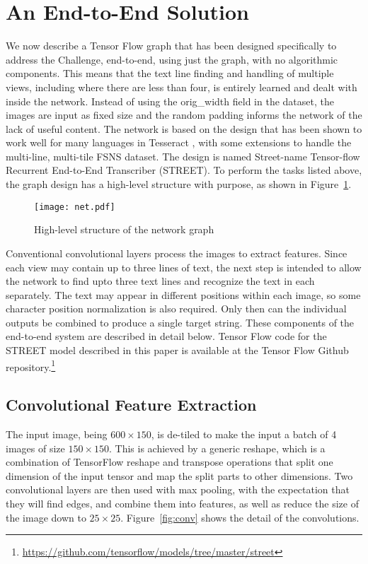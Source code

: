 \documentclass[runningheads]{llncs}
\begin{document}
\section{An End-to-End Solution} \label{baseline}

We now describe a Tensor Flow graph that has been designed specifically to address the Challenge,
 end-to-end, using just the graph, with no algorithmic components. This means that the text line
finding and handling of multiple views, including where there are less than four, is entirely learned
and dealt with inside the network. Instead of using the orig\_width field in the dataset, the images
are input as fixed size and the random padding informs the network of the lack of useful content.
 The network is based on the design that has been shown to work well for many languages in
 Tesseract \cite{tutorial},
 with some extensions to handle the multi-line, multi-tile FSNS dataset.
 The design is named Street-name Tensor-flow Recurrent End-to-End Transcriber (STREET).
 To perform the tasks listed above, the graph design has a high-level structure with purpose,
 as shown in Figure~\ref{fig:net}.

\begin{figure}
\centering
\vspace{-8cm}
\texttt{[image: net.pdf]}
\caption{High-level structure of the network graph}
\label{fig:net}
\end{figure}

Conventional convolutional layers process the images to extract features. Since each view may contain
 up to three lines of text, the next step is intended to allow the network to find upto three text lines
and recognize the text in each separately.
 The text may appear in different positions within each image, so some character
 position normalization is also required. Only then can the individual outputs be combined to produce
 a single target string. These components of the end-to-end system are described in detail below. 
Tensor Flow code for the STREET model described in this paper is available at the Tensor Flow Github
repository.\footnote{\url{https://github.com/tensorflow/models/tree/master/street}} 

\subsection{Convolutional Feature Extraction}

The input image, being $600\times150$, is de-tiled to make the input a batch of 4 images of size $150\times150$.
 This is achieved by a generic reshape, which is a combination of TensorFlow reshape and transpose
 operations that split one dimension of the input tensor and map the split parts to other dimensions.
 Two convolutional layers are then used with max pooling, with the expectation that they will find edges,
 and combine them into features, as well as reduce the size of the image down to
 $25\times25$. Figure~\ref{fig:conv} shows the detail of the convolutions.
\end{document}
